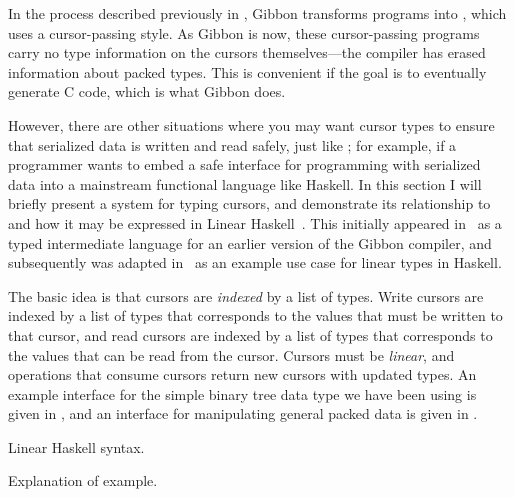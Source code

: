 In the process described previously in , Gibbon
transforms programs into \lamcur{}, which uses a cursor-passing style. As Gibbon
is now, these cursor-passing programs carry no type information on the cursors
themselves---the compiler has erased information about packed types. This is
convenient if the goal is to eventually generate C code, which is what Gibbon
does.

However, there are other situations where you may want cursor types to ensure
that serialized data is written and read safely, just like \ourcalc{}; for
example, if a programmer wants to embed a safe interface for programming with
serialized data into a mainstream functional language like Haskell. In this
section I will briefly present a system for typing cursors, and demonstrate its
relationship to \lamcur{} and how it may be expressed in Linear
Haskell~\cite{linear-haskell}. This initially appeared in~\cite{ecoop17-gibbon}
as a typed intermediate language for an earlier version of the Gibbon compiler,
and subsequently was adapted in~\cite{linear-haskell} as an example use case for
linear types in Haskell.

The basic idea is that cursors are \emph{indexed} by a list of types.
Write cursors are indexed by a list of types that corresponds to the values
that must be written to that cursor, and read cursors are indexed by a list of
types that corresponds to the values that can be read from the cursor.
Cursors must be \emph{linear}, and operations that consume cursors return
new cursors with updated types. An example interface for the simple
binary tree data type we have been using is given in ,
and an interface for manipulating general packed data is given in
.

Linear Haskell syntax.

Explanation of example.



